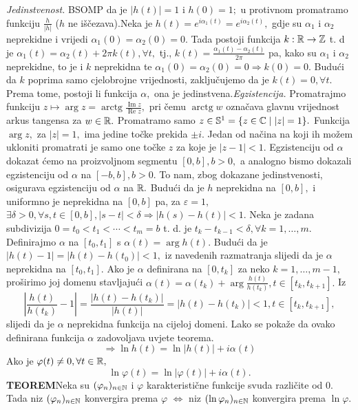 \documentclass{article}
\newcommand{\arctg}{\operatorname{arctg}}
\newcommand{\myre}{\operatorname{Re}}
\newcommand{\myim}{\operatorname{Im}}
\begin{document}
\textit{Jedinstvenost.} BSOMP da je \(|h(t)|=1\) i \(h(0)=1;\) u protivnom promatramo funkciju \(\frac{h}{|h|}\) (\(h\) ne iščezava).\newline Neka je \(h(t)=e^{i\alpha_1(t)}=e^{i\alpha_2(t)},\) gdje su \(\alpha_1\) i \(\alpha_2\) neprekidne i vrijedi \(\alpha_1(0)=\alpha_2(0)=0.\) Tada postoji funkcija \(k:\Bbb R\to\Bbb Z\) t. d je \(\alpha_1(t)=\alpha_2(t)+2\pi k(t),\forall t,\) tj., \(k(t)=\frac{\alpha_1(t)-\alpha_2(t)}{2\pi}\) pa, kako su \(\alpha_1\) i \(\alpha_2\) neprekidne, to je i \(k\) neprekidna te \(\alpha_1(0)=\alpha_2(0)=0\Rightarrow k(0)=0.\) Budući da \(k\) poprima samo cjelobrojne vrijednosti, zaključujemo da je \(k(t)=0,\forall t.\) Prema tome, postoji li funkcija \(\alpha,\) ona je jedinstvena.\newline\newline\textit{Egzistencija.} Promatrajmo funkciju \(z\mapsto\arg z=\arctg\frac{\myim z}{\myre z},\) pri čemu \(\arctg w\) označava glavnu vrijednost arkus tangensa za \(w\in\Bbb R.\) Promatramo samo \(z\in\Bbb S^1=\{z\in\Bbb C\mid |z|=1\}.\) Funkcija \(\arg z,\) za \(|z|=1,\) ima jedine točke prekida \(\pm i.\) Jedan od načina na koji ih možem ukloniti promatrati je samo one točke \(z\) za koje je \(|z-1|<1.\) Egzistenciju od \(\alpha\) dokazat ćemo na proizvoljnom segmentu \([0,b],b>0,\) a analogno bismo dokazali egzistenciju od \(\alpha\) na \([-b,b],b>0.\) To nam, zbog dokazane jedinstvenosti, osigurava egzistenciju od \(\alpha\) na \(\Bbb R.\) Budući da je \(h\) neprekidna na \([0,b],\) i uniformno je neprekidna na \([0,b]\) pa, za \(\varepsilon=1,\) \(\exists\delta>0,\forall s,t\in[0,b],|s-t|<\delta\Rightarrow|h(s)-h(t)|<1.\) Neka je zadana subdivizija \(0=t_0<t_1<\cdots<t_m=b\) t. d. je \(t_k-t_{k-1}<\delta,\forall k=1,\ldots,m.\) Definirajmo \(\alpha\) na \([t_0,t_1]\) s \(\alpha(t)=\arg h(t).\) Budući da je \(|h(t)-1|=|h(t)-h(t_0)|<1,\) iz navedenih razmatranja slijedi da je \(\alpha\) neprekidna na \([t_0,t_1].\) Ako je \(\alpha\) definirana na \([0,t_k]\) za neko \(k=1,\ldots,m-1,\) proširimo joj domenu stavljajući \(\alpha(t)=\alpha(t_k)+\arg\frac{h(t)}{h(t_k)},t\in[t_k,t_{k+1}].\) Iz \[\left|\frac{h(t)}{h(t_k)}-1\right|=\frac{|h(t)-h(t_k)|}{|h(t)|}=|h(t)-h(t_k)|<1,t\in[t_k,t_{k+1}],\] slijedi da je \(\alpha\) neprekidna funkcija na cijeloj domeni. Lako se pokaže da ovako definirana funkcija \(\alpha\) zadovoljava uvjete teorema.
\[\Rightarrow\ln h(t)=\ln|h(t)|+i\alpha(t)\] Ako je \(\varphi(t)\ne 0,\forall t\in\Bbb R,\) \[\ln\varphi(t)=\ln|\varphi(t)|+i\alpha(t).\]
\textbf{TEOREM}\newline Neka su \((\varphi_n)_{n\in\Bbb N}\) i \(\varphi\) karakteristične funkcije svuda različite od \(0.\) Tada niz \((\varphi_n)_{n\in\Bbb N}\) konvergira prema \(\varphi\) \(\Leftrightarrow\) niz \((\ln\varphi_n)_{n\in\Bbb N}\) konvergira prema \(\ln\varphi.\)\newline\newline
\end{document}
